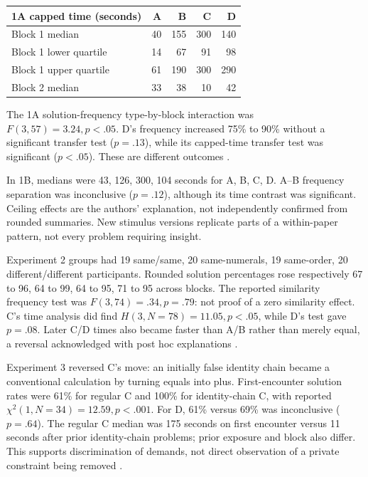 \begin{tabular}{@{}lrrrr@{}}
\toprule 1A capped time (seconds) &A&B&C&D\\ \midrule
Block 1 median &40&155&300&140\\
Block 1 lower quartile &14&67&91&98\\
Block 1 upper quartile &61&190&300&290\\
Block 2 median &33&38&10&42\\
\bottomrule
\end{tabular}

The 1A solution-frequency type-by-block interaction was
\(F(3,57)=3.24,p<.05\). D's frequency increased 75\% to 90\% without
a significant transfer test (\(p=.13\)), while its capped-time transfer
test was significant (\(p<.05\)). These are different outcomes
\parencite[pp.~1540--1541,tables~2--3]{KnoblichEtAl1999ConstraintsChunks}.

In 1B, medians were 43, 126, 300, 104 seconds for A, B, C, D.
A--B frequency separation was inconclusive (\(p=.12\)), although its time
contrast was significant. Ceiling effects are the authors' explanation,
not independently confirmed from rounded summaries.
New stimulus versions replicate parts of a within-paper pattern,
not every problem requiring insight.

Experiment 2 groups had 19 same/same, 20 same-numerals, 19 same-order,
20 different/different participants. Rounded solution percentages rose
respectively 67 to 96, 64 to 99, 64 to 95, 71 to 95 across blocks.
The reported similarity frequency test was \(F(3,74)=.34,p=.79\):
not proof of a zero similarity effect. C's time analysis did find
\(H(3,N=78)=11.05,p<.05\), while D's test gave \(p=.08\).
Later C/D times also became faster than A/B rather than merely equal,
a reversal acknowledged with post hoc explanations
\parencite[pp.~1544--1547,tables~7--9]{KnoblichEtAl1999ConstraintsChunks}.

Experiment 3 reversed C's move: an initially false identity chain became
a conventional calculation by turning equals into plus.
First-encounter solution rates were 61\% for regular C and 100\% for
identity-chain C, with reported \(\chi^2(1,N=34)=12.59,p<.001\).
For D, 61\% versus 69\% was inconclusive (\(p=.64\)).
The regular C median was 175 seconds on first encounter versus 11 seconds
after prior identity-chain problems; prior exposure and block also differ.
This supports discrimination of demands, not direct observation of a
private constraint being removed
\parencite[pp.~1548--1550,tables~10--12]{KnoblichEtAl1999ConstraintsChunks}.

